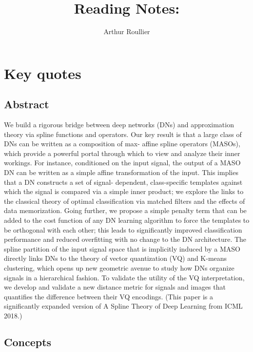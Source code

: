 \documentclass{article}
\title{Reading Notes: \cite{balestriero_mad_2018}}
\author{Arthur Roullier}
\begin{document}
\maketitle




\section{Key quotes}


\subsection{Abstract}
We build a rigorous bridge between deep networks (DNs) and approximation theory via spline functions and operators. Our key result is that a large class of DNs can be written as a composition of max- affine spline operators (MASOs), which provide a powerful portal through which to view and analyze their inner workings. For instance, conditioned on the input signal, the output of a MASO DN can be written as a simple affine transformation of the input. This implies that a DN constructs a set of signal- dependent, class-specific templates against which the signal is compared via a simple inner product; we explore the links to the classical theory of optimal classification via matched filters and the effects of data memorization. Going further, we propose a simple penalty term that can be added to the cost function of any DN learning algorithm to force the templates to be orthogonal with each other; this leads to significantly improved classification performance and reduced overfitting with no change to the DN architecture. The spline partition of the input signal space that is implicitly induced by a MASO directly links DNs to the theory of vector quantization (VQ) and K-means clustering, which opens up new geometric avenue to study how DNs organize signals in a hierarchical fashion. To validate the utility of the VQ interpretation, we develop and validate a new distance metric for signals and images that quantifies the difference between their VQ encodings. (This paper is a significantly expanded version of A Spline Theory of Deep Learning from ICML 2018.)


\subsection{Concepts}
\end{document}
